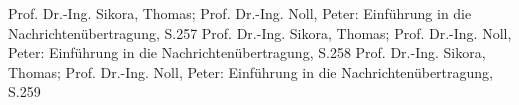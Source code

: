 

\begin{thebibliography}{999}
  Prof. Dr.-Ing. Sikora, Thomas; Prof. Dr.-Ing. Noll, Peter: Einführung in die
 Nachrichtenübertragung, S.257
 Prof. Dr.-Ing. Sikora, Thomas; Prof. Dr.-Ing. Noll, Peter: Einführung in die
 Nachrichtenübertragung, S.258
 Prof. Dr.-Ing. Sikora, Thomas; Prof. Dr.-Ing. Noll, Peter: Einführung in die
 Nachrichtenübertragung, S.259
 



\end{thebibliography}


  	    
